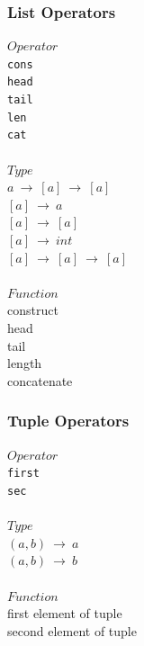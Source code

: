 \documentclass[5pt]{article}
\begin{document}
\subsubsection{List Operators}
\begin{multicols}{3}
\noindent $Operator$ \\
\hspace*{5mm} \texttt{cons} \\
\hspace*{5mm} \texttt{head} \\
\hspace*{5mm} \texttt{tail} \\
\hspace*{5mm} \texttt{len} \\
\hspace*{5mm} \texttt{cat} \\
\columnbreak \\
\noindent $Type$ \\
$a \ \rightarrow \ [a] \ \rightarrow \ [a] $ \\
$[a] \ \rightarrow \ a $ \\
$[a] \ \rightarrow \ [a] $ \\
$[a] \ \rightarrow \ int $ \\
$[a] \ \rightarrow \ [a] \ \rightarrow \ [a] $ \\
\columnbreak \\
\noindent $Function$ \\
construct \\
head \\
tail \\
length \\
concatenate \\
\end{multicols}
\subsubsection{Tuple Operators}
\begin{multicols}{3}
\noindent $Operator$ \\
\hspace*{5mm} \texttt{first} \\
\hspace*{5mm} \texttt{sec} \\
\columnbreak \\
\noindent $Type$ \\
$(a,b) \ \rightarrow \  a$ \\
$(a,b) \ \rightarrow \  b$ \\
\columnbreak \\
\noindent $Function$ \\
first element of tuple \\
second element of tuple \\
\end{multicols}
\end{document}
